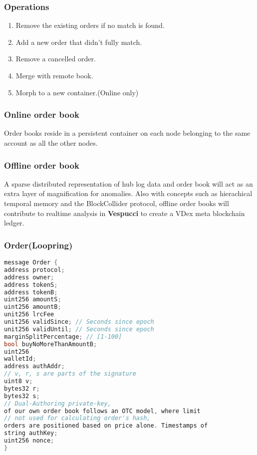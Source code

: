 \documentclass[]{article}
\begin{document}
\subsubsection{Operations}
\begin{enumerate}
\item Remove the existing orders if no match is found.
\item Add a new order that didn't fully match.
\item Remove a cancelled order.
\item Merge with remote book.
\item Morph to a new container.(Online only)
\end{enumerate}

\subsubsection{Online order book}
Order books reside in a persistent container on each node belonging to the same account as all the other nodes.
\subsubsection{Offline order book}
A sparse distributed representation of hub log data and order book will
act as an extra layer of magnification for anomalies.
Also with concepts such as hierachical temporal memory and the BlockCollider protocol, offline order books will contribute to realtime analysis in \textbf{Vespucci} to create a VDex meta blockchain ledger. 
\subsubsection{Order(Loopring)}
\begin{lstlisting}[language=C++, caption={C++ code using listings}]
message Order {
address protocol;
address owner;
address tokenS;
address tokenB;
uint256 amountS;
uint256 amountB;
unit256 lrcFee
unit256 validSince; // Seconds since epoch
unit256 validUntil; // Seconds since epoch
marginSplitPercentage; // [1-100]
bool buyNoMoreThanAmountB;
uint256
walletId;
address authAddr;
// v, r, s are parts of the signature
uint8 v;
bytes32 r;
bytes32 s;
// Dual-Authoring private-key,
of our own order book follows an OTC model, where limit
// not used for calculating order's hash,
orders are positioned based on price alone. Timestamps of
string authKey;
uint256 nonce;
}

\end{lstlisting}
\end{document}
